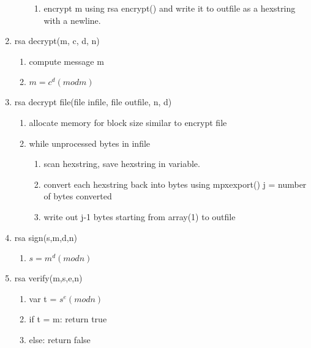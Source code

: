 \documentclass[11pt]{article}
\begin{document}
\begin{enumerate}
\begin{enumerate}
\begin{enumerate}
		\item encrypt m using rsa encrypt() and write it to outfile as a hexstring with a newline. 
		\end{enumerate}
	\end{enumerate}
\item rsa decrypt(m, c, d, n)
	\begin{enumerate}
	\item compute message m
	\item \(m = c^d (mod m)\)
	\end{enumerate}
\item rsa decrypt file(file infile, file outfile, n, d)
	\begin{enumerate}
	\item allocate memory for block size similar to encrypt file
	\item while unprocessed bytes in infile
		\begin{enumerate}
		\item scan hexstring, save hexstring in variable.
		\item convert each hexstring back into bytes using mpxexport() j = number of bytes converted
		\item write out j-1 bytes starting from array(1) to outfile
		\end{enumerate}
	\end{enumerate}
\item rsa sign(s,m,d,n)
	\begin{enumerate}
	\item \(s = m^d (mod n)\)
	\end{enumerate}
\item rsa verify(m,s,e,n)
	\begin{enumerate}
	\item var t = \(s^e (mod n)\)
	\item if t = m: return true
	\item else: return false
	\end{enumerate}


\end{enumerate}
\end{document}
